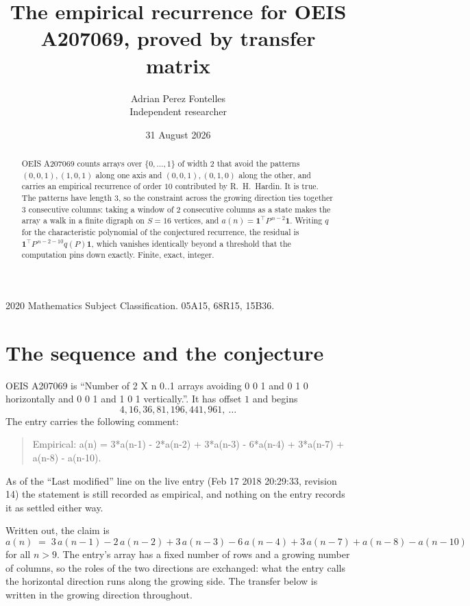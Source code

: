 \documentclass[11pt,a4paper]{article}
\title{The empirical recurrence for OEIS A207069, proved by transfer matrix}
\author{Adrian Perez Fontelles\\ \small Independent researcher}
\date{31 August 2026}
\theoremstyle{plain}
\theoremstyle{definition}
\begin{document}
\maketitle

\begin{abstract}
OEIS A207069 counts arrays over $\{0,\dots,1\}$ of width $2$ that avoid the patterns
$(0,0,1), (1,0,1)$ along one axis and $(0,0,1), (0,1,0)$ along the other, and carries an empirical recurrence of
order $10$ contributed by R.~H.~Hardin. It is true. The patterns have length $3$, so
the constraint across the growing direction ties together $3$ consecutive columns: taking a
window of $2$ consecutive columns as a state makes the array a walk in a finite digraph
on $S=16$ vertices, and $a(n)=\mathbf{1}^{\!\top}P^{\,n-2}\mathbf{1}$. Writing $q$
for the characteristic polynomial of the conjectured recurrence, the residual is
$\mathbf{1}^{\!\top}P^{\,n-2-10}q(P)\mathbf{1}$, which vanishes identically
beyond a threshold that the computation pins down exactly. Finite, exact, integer.
\end{abstract}

\noindent\small 2020 Mathematics Subject Classification. 05A15, 68R15, 15B36.\normalsize

\section{The sequence and the conjecture}

OEIS A207069 is ``Number of 2 X n 0..1 arrays avoiding 0 0 1 and 0 1 0 horizontally and 0 0 1 and 1 0 1 vertically.''. It has offset
$1$ and begins
\[
4, 16, 36, 81, 196, 441, 961,\ \dots
\]
The entry carries the following comment:
\begin{quote}\small
Empirical: a(n) = 3*a(n-1) - 2*a(n-2) + 3*a(n-3) - 6*a(n-4) + 3*a(n-7) + a(n-8) - a(n-10).
\end{quote}
As of the ``Last modified'' line on the live entry (Feb 17 2018 20:29:33, revision
14) the statement is still recorded as empirical, and nothing on the entry
records it as settled either way.

Written out, the claim is
\begin{equation}\label{eq:conj}
a(n)\;=\;3\,a(n-1) - 2\,a(n-2) + 3\,a(n-3) - 6\,a(n-4) + 3\,a(n-7) + a(n-8) - a(n-10)
\end{equation}
for all $n>9$. The entry's array has a fixed number of rows and a growing number of
columns, so the roles of the two directions are exchanged: what the entry calls the
horizontal direction runs along the growing side. The transfer below is written in the
growing direction throughout.
\end{document}
